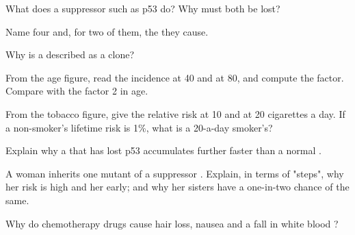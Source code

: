 \begin{exercise}[$\star$]\label{exo:g11:cancer:3}
What does a  suppressor  such as p53 do? Why must both
 be lost?
\end{exercise}

\begin{exercise}[$\star$]\label{exo:g11:cancer:4}
Name four  and, for two of them, the  they cause.
\end{exercise}

\begin{exercise}[$\star$]\label{exo:g11:cancer:5}
Why is a  described as a clone?
\end{exercise}

\begin{exercise}[$\star\star$]\label{exo:g11:cancer:6}
From the age figure, read the incidence at 40 and at 80, and compute
the factor. Compare with the factor 2 in age.
\end{exercise}

\begin{exercise}[$\star\star$]\label{exo:g11:cancer:7}
From the tobacco figure, give the relative risk at 10 and at 20
cigarettes a day. If a non-smoker's lifetime risk is 1\%, what is a
20-a-day smoker's?
\end{exercise}

\begin{exercise}[$\star\star$]\label{exo:g11:cancer:8}
Explain why a  that has lost p53 accumulates further 
faster than a normal .
\end{exercise}

\begin{exercise}[$\star\star$]\label{exo:g11:cancer:9}
A woman inherits one mutant  of a  suppressor
. Explain, in terms of "steps", why her risk is high and her
 early; and why her sisters have a one-in-two chance of the
same.
\end{exercise}

\begin{exercise}[$\star\star$]\label{exo:g11:cancer:10}
Why do chemotherapy drugs cause hair loss, nausea and a fall in white
blood ?
\end{exercise}


